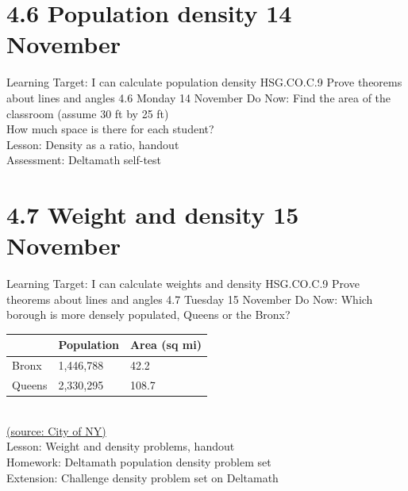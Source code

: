 \documentclass[onlytextwidth, aspectratio=169]{beamer}
\begin{document}
\section{4.6 Population density \hfill 14 November \,}
\begin{frame}{Learning Target: I can calculate population density}
  {HSG.CO.C.9 Prove theorems about lines and angles  \hfill \alert{4.6 Monday 14 November}}
  Do Now: Find the area of the classroom (assume 30 ft by 25 ft) \\[0.5cm]
  How much space is there for each student? \\[0.5cm]
    Lesson: Density as a ratio, handout \\
    Assessment: Deltamath self-test
\end{frame}

\section{4.7 Weight and density \hfill 15 November \,}
\begin{frame}{Learning Target: I can calculate weights and density}
  {HSG.CO.C.9 Prove theorems about lines and angles  \hfill \alert{4.7 Tuesday 15 November}}
  Do Now: Which borough is more densely populated, Queens or the Bronx? \\[0.5cm]
 
\begin{tabular}{|p{1cm}|p{3cm}|p{2cm}|}
  \hline
   & Population & Area (sq mi)\\
  \hline
  Bronx & 1,446,788 & 42.2  \\
  \hline
  Queens & 2,330,295 & 108.7  \\
  \hline
\end{tabular} \\
\href{https://data.cityofnewyork.us/City-Government/New-York-City-Population-by-Borough-1950-2040/xywu-7bv9/data}{(source: City of NY)} \\[0.5cm]
    Lesson: Weight and density problems, handout \\
    Homework: Deltamath population density problem set \\
    Extension: Challenge density problem set on Deltamath
\end{frame}
\end{document}

